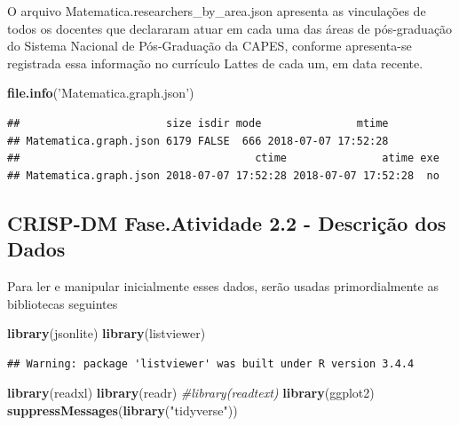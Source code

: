 \documentclass[]{article}
\newenvironment{Shaded}{\begin{snugshade}}{\end{snugshade}}
\newcommand{\KeywordTok}[1]{\textcolor[rgb]{0.13,0.29,0.53}{\textbf{#1}}}
\newcommand{\StringTok}[1]{\textcolor[rgb]{0.31,0.60,0.02}{#1}}
\newcommand{\CommentTok}[1]{\textcolor[rgb]{0.56,0.35,0.01}{\textit{#1}}}
\newcommand{\NormalTok}[1]{#1}
\begin{document}
O arquivo Matematica.researchers\_by\_area.json apresenta as vinculações
de todos os docentes que declararam atuar em cada uma das áreas de
pós-graduação do Sistema Nacional de Pós-Graduação da CAPES, conforme
apresenta-se registrada essa informação no currículo Lattes de cada um,
em data recente.

\begin{Shaded}
\begin{Highlighting}[]
\KeywordTok{file.info}\NormalTok{(}\StringTok{'Matematica.graph.json'}\NormalTok{)}
\end{Highlighting}
\end{Shaded}

\begin{verbatim}
##                       size isdir mode               mtime
## Matematica.graph.json 6179 FALSE  666 2018-07-07 17:52:28
##                                     ctime               atime exe
## Matematica.graph.json 2018-07-07 17:52:28 2018-07-07 17:52:28  no
\end{verbatim}

\subsection{CRISP-DM Fase.Atividade 2.2 - Descrição dos
Dados}\label{crisp-dm-fase.atividade-2.2---descricao-dos-dados}

Para ler e manipular inicialmente esses dados, serão usadas
primordialmente as bibliotecas seguintes

\begin{Shaded}
\begin{Highlighting}[]
\KeywordTok{library}\NormalTok{(jsonlite)}
\KeywordTok{library}\NormalTok{(listviewer)}
\end{Highlighting}
\end{Shaded}

\begin{verbatim}
## Warning: package 'listviewer' was built under R version 3.4.4
\end{verbatim}

\begin{Shaded}
\begin{Highlighting}[]
\KeywordTok{library}\NormalTok{(readxl)}
\KeywordTok{library}\NormalTok{(readr)}
\CommentTok{#library(readtext)}
\KeywordTok{library}\NormalTok{(ggplot2)}
\KeywordTok{suppressMessages}\NormalTok{(}\KeywordTok{library}\NormalTok{(}\StringTok{"tidyverse"}\NormalTok{))}
\end{Highlighting}
\end{Shaded}
\end{document}
